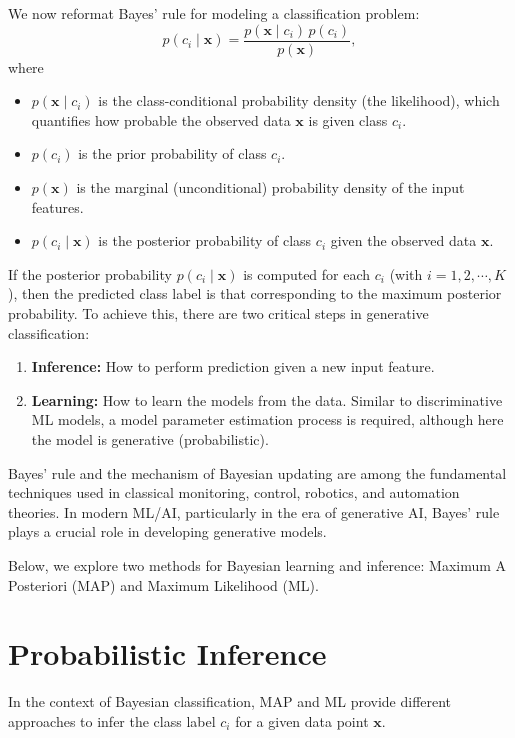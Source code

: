 \documentclass[12pt]{article}
\begin{document}
We now reformat Bayes' rule for modeling a classification problem:
\begin{equation}
p(c_i \mid \bm{x}) = \frac{p(\bm{x} \mid c_i) \, p(c_i)}{p(\bm{x})},
\end{equation}
where 
\begin{itemize}
    \item \(p(\bm{x} \mid c_i)\) is the class-conditional probability density (the likelihood), which quantifies how probable the observed data \(\bm{x}\) is given class \(c_i\).
    \item \(p(c_i)\) is the prior probability of class \(c_i\).
    \item \(p(\bm{x})\) is the marginal (unconditional) probability density of the input features.
    \item \(p(c_i \mid \bm{x})\) is the posterior probability of class \(c_i\) given the observed data \(\bm{x}\).
\end{itemize}

If the posterior probability \(p(c_i \mid \bm{x})\) is computed for each \(c_i\) (with \(i = 1, 2, \cdots, K\)), then the predicted class label is that corresponding to the maximum posterior probability. To achieve this, there are two critical steps in generative classification:
\begin{enumerate}
    \item \textbf{Inference:} How to perform prediction given a new input feature.
    \item \textbf{Learning:} How to learn the models from the data. Similar to discriminative ML models, a model parameter estimation process is required, although here the model is generative (probabilistic).
\end{enumerate}

Bayes' rule and the mechanism of Bayesian updating are among the fundamental techniques used in classical monitoring, control, robotics, and automation theories. In modern ML/AI, particularly in the era of generative AI, Bayes' rule plays a crucial role in developing generative models.

Below, we explore two methods for Bayesian learning and inference: Maximum A Posteriori (MAP) and Maximum Likelihood (ML).

\section{Probabilistic Inference}
In the context of Bayesian classification, MAP and ML provide different approaches to infer the class label \(c_i\) for a given data point \(\bm{x}\).
\end{document}
